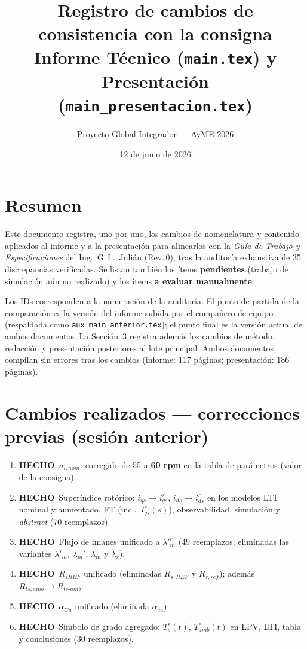 \documentclass[11pt,a4paper]{article}
\title{Registro de cambios de consistencia con la consigna\\
\large Informe Técnico (\texttt{main.tex}) y Presentación (\texttt{main\_presentacion.tex})}
\author{Proyecto Global Integrador --- AyME 2026}
\date{12 de junio de 2026}
\newcommand{\hecho}{\textcolor{okgreen}{\textbf{HECHO}}}
\begin{document}
\maketitle

\section*{Resumen}
Este documento registra, uno por uno, los cambios de nomenclatura y contenido aplicados al informe y a la presentación para alinearlos con la \emph{Guía de Trabajo y Especificaciones} del Ing.\ G.\,L.\ Julián (Rev.\,0), tras la auditoría exhaustiva de 35 discrepancias verificadas. Se listan también los ítems \textbf{pendientes} (trabajo de simulación aún no realizado) y los ítems \textbf{a evaluar manualmente}.

Los IDs corresponden a la numeración de la auditoría. El punto de partida de la comparación es la versión del informe subida por el compañero de equipo (respaldada como \texttt{aux\_main\_anterior.tex}); el punto final es la versión actual de ambos documentos. La Sección~3 registra además los cambios de método, redacción y presentación posteriores al lote principal. Ambos documentos compilan sin errores tras los cambios (informe: 117 páginas; presentación: 186 páginas).

\section{Cambios realizados --- correcciones previas (sesión anterior)}

\begin{enumerate}[label=\textbf{D\arabic*.}]
  \item \hecho\ $n_{l,nom}$: corregido de 55 a \textbf{60 rpm} en la tabla de parámetros (valor de la consigna).
  \item \hecho\ Superíndice rotórico: $i_{qs}\to i_{qs}^r$, $i_{ds}\to i_{ds}^r$ en los modelos LTI nominal y aumentado, FT (incl.\ $I_{qs}^r(s)$), observabilidad, simulación y \emph{abstract} (70 reemplazos).
  \item \hecho\ Flujo de imanes unificado a $\lambda'^r_m$ (49 reemplazos; eliminadas las variantes $\lambda'_m$, $\lambda_m'$, $\lambda_m$ y $\lambda_r$).
  \item \hecho\ $R_{sREF}$ unificado (eliminadas $R_{s,REF}$ y $R_{s,ref}$); además $R_{ts,amb}\to R_{ts\text{-}amb}$.
  \item \hecho\ $\alpha_{Cu}$ unificado (eliminada $\alpha_{cu}$).
  \item \hecho\ Símbolo de grado agregado: $T_s^\circ(t)$, $T_{amb}^\circ(t)$ en LPV, LTI, tabla y conclusiones (30 reemplazos).
\end{enumerate}
\end{document}
